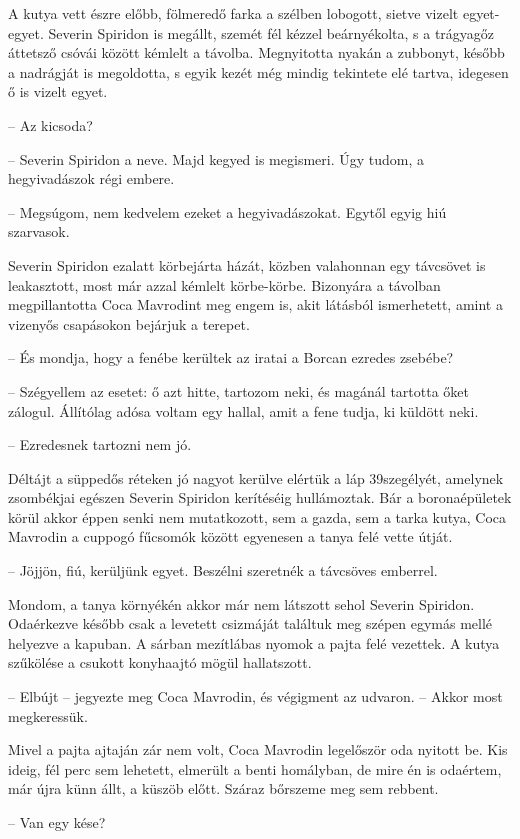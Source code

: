 \documentclass{IEEEtran}
\begin{document}
A kutya vett észre előbb, fölmeredő farka a szélben lobogott, sietve vizelt
egyet-egyet. Severin Spiridon is megállt, szemét fél kézzel beárnyékolta, s a
trágyagőz áttetsző csóvái között kémlelt a távolba. Megnyitotta nyakán a
zubbonyt, később a nadrágját is megoldotta, s egyik kezét még mindig tekintete
elé tartva, idegesen ő is vizelt egyet.

– Az kicsoda?

– Severin Spiridon a neve. Majd kegyed is megismeri. Úgy tudom, a
hegyivadászok régi embere.

– Megsúgom, nem kedvelem ezeket a hegyivadászokat. Egytől egyig hiú szarvasok.

Severin Spiridon ezalatt körbejárta házát, közben valahonnan egy távcsövet is
leakasztott, most már azzal kémlelt körbe-körbe. Bizonyára a távolban
megpillantotta Coca Mavrodint meg engem is, akit látásból ismerhetett, amint a
vizenyős csapásokon bejárjuk a terepet.

– És mondja, hogy a fenébe kerültek az iratai a Borcan ezredes zsebébe?

– Szégyellem az esetet: ő azt hitte, tartozom neki, és magánál tartotta őket
zálogul. Állítólag adósa voltam egy hallal, amit a fene tudja, ki küldött
neki.

– Ezredesnek tartozni nem jó.

Déltájt a süppedős réteken jó nagyot kerülve elértük a láp 39szegélyét,
amelynek zsombékjai egészen Severin Spiridon kerítéséig hullámoztak. Bár a
boronaépületek körül akkor éppen senki nem mutatkozott, sem a gazda, sem a
tarka kutya, Coca Mavrodin a cuppogó fűcsomók között egyenesen a tanya felé
vette útját.

– Jöjjön, fiú, kerüljünk egyet. Beszélni szeretnék a távcsöves emberrel.

Mondom, a tanya környékén akkor már nem látszott sehol Severin Spiridon.
Odaérkezve később csak a levetett csizmáját találtuk meg szépen egymás mellé
helyezve a kapuban. A sárban mezítlábas nyomok a pajta felé vezettek. A kutya
szűkölése a csukott konyhaajtó mögül hallatszott.

– Elbújt – jegyezte meg Coca Mavrodin, és végigment az udvaron. – Akkor most
megkeressük.

Mivel a pajta ajtaján zár nem volt, Coca Mavrodin legelőször oda nyitott be.
Kis ideig, fél perc sem lehetett, elmerült a benti homályban, de mire én is
odaértem, már újra künn állt, a küszöb előtt. Száraz bőrszeme meg sem rebbent.

– Van egy kése?
\end{document}
